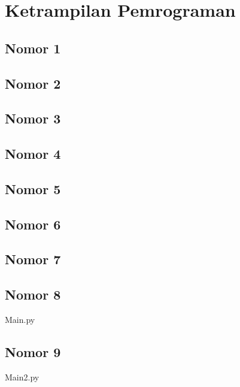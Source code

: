 \chapter{Ketrampilan Pemrograman}

\section{Nomor 1}

\section{Nomor 2}

\section{Nomor 3}

\section{Nomor 4}

\section{Nomor 5}

\section{Nomor 6}

\section{Nomor 7}

\section{Nomor 8}

Main.py

\section{Nomor 9}

Main2.py
